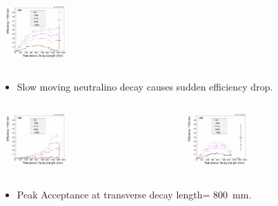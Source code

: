 \documentclass{beamer}
\begin{document}
\begin{frame}
\begin{minipage}[t]{0.83\paperwidth}
\begin{columns}
\begin{column}{0.50\linewidth}
\begin{tcolorbox}[colback=UNL@Cream!5,colframe=UNL@LightGrey!70,title=\textcolor{UMN@Maroon}{\textbf{Acceptance }}]
     \mbox{
\includegraphics[height=2cm, width=\textwidth]{THESISPLOTS/Accp_ctbgT.png}}
      \end{tcolorbox}
     \end{column}
   \end{columns}
   \begin{itemize}
    \item Slow moving neutralino decay causes sudden efficiency drop.
   \end{itemize}
\end{minipage}
\begin{minipage}[b]{0.83\paperwidth}
 \begin{columns}
     \begin{column}{0.50\linewidth}
      \begin{tcolorbox}[colback=UNL@Cream!5,colframe=UNL@LightGrey!70,title=\textcolor{UMN@Maroon}{\textbf{Slow moving}}] 
    \mbox{
           \includegraphics[height=2cm,width=\textwidth]{THESISPLOTS/Accp_ctbgT1.png}}
       \end{tcolorbox}    
     \end{column}
     \begin{column}{0.50\linewidth}
     \begin{tcolorbox}[colback=UNL@Cream!5,colframe=UNL@LightGrey!70,title=\textcolor{UMN@Maroon}{\textbf{Off-Pointing}}]
     \mbox{
\includegraphics[height=2cm, width=\textwidth]{THESISPLOTS/Accp_ctbgT2.png}}
      \end{tcolorbox}
     \end{column}
   \end{columns}
\begin{itemize}
    \item Peak Acceptance at transverse decay length= 800~mm.
  \end{itemize}
 \end{minipage}
 
\end{frame}
\end{document}
